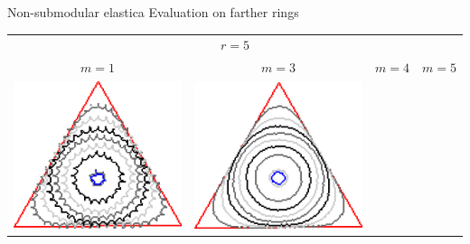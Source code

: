 \begin{frame}
{Non-submodular elastica}
{Evaluation on farther rings}
\begin{tabular}{cccc}
\multicolumn{4}{c}{$r=5$}\\
$m=1$ & $m=3$ & $m=4$ & $m=5$ \\
\includegraphics[scale=0.13]{figures/non-submodular-elastica/level-effect/triangle-l1.png}&
\includegraphics[scale=0.13]{figures/non-submodular-elastica/level-effect/triangle-l3.png}&

\end{tabular}
\end{frame}
